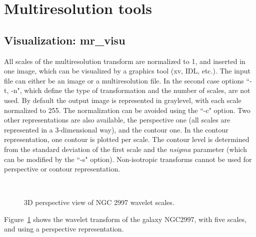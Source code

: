 \section{Multiresolution tools}
\subsection{Visualization: mr\_visu}
All scales of the multiresolution transform are normalized to 1, and inserted
in one image, which can be
visualized by a graphics tool  (xv, IDL, etc.). 
The input
file can either be an image or a multiresolution file. In the second case 
options ``-t, -n", which define the type of transformation and the number of
scales, are not used. By default the output image is represented in graylevel,
with each scale normalized to 255. The normalization can be avoided using 
the ``-c"
option. Two other representations are also available, the perspective one
(all scales are represented in a 3-dimensional way), and the contour one.
In the contour representation, one contour is plotted per scale. The contour
level is determined from the standard deviation of the first scale and the {\em nsigma}
parameter (which can be modified by the ``-s" option). Non-isotropic 
transforms cannot be used for perspective or contour representation. 


\begin{figure}[htb]
\centerline{
\hbox{
}}
\caption{3D perspective view of NGC 2997 wavelet scales.}
\label{fig_wave_3D}
\end{figure}
Figure~\ref{fig_wave_3D} shows the wavelet transform of the galaxy NGC2997,
with five scales, and using a perspective representation.

